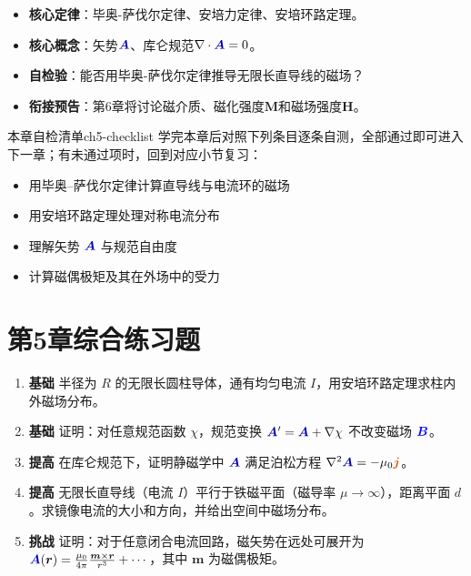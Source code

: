 \documentclass[11pt,a4paper,openany,oneside]{book}
\newcommand{\vecB}{\textcolor{blue}{\vect{B}}}
\newcommand{\vecJ}{\textcolor{cororange}{\vect{j}}}
\newcommand{\vecA}{\textcolor{blue!70!black}{\vect{A}}}
\newcommand{\muz}{\mu_0}
\newcommand{\vect}[1]{\bm{#1}}
\newcommand{\divg}{\nabla\cdot}
\newcommand{\lap}{\nabla^2}
\begin{document}
\begin{chapterreview}
\begin{itemize}[nosep]
\item \textbf{核心定律}：毕奥-萨伐尔定律、安培力定律、安培环路定理。
\item \textbf{核心概念}：矢势$\vecA$、库仑规范$\divg\vecA=0$。
\item \textbf{自检验}：能否用毕奥-萨伐尔定律推导无限长直导线的磁场？
\item \textbf{衔接预告}：第6章将讨论磁介质、磁化强度$\vect{M}$和磁场强度$\vect{H}$。
\end{itemize}
\end{chapterreview}

\begin{tip}{本章自检清单}{ch5-checklist}
学完本章后对照下列条目逐条自测，全部通过即可进入下一章；有未通过项时，回到对应小节复习：
\begin{itemize}[label=$\square$, nosep]
\item 用毕奥--萨伐尔定律计算直导线与电流环的磁场
\item 用安培环路定理处理对称电流分布
\item 理解矢势 $\vecA$ 与规范自由度
\item 计算磁偶极矩及其在外场中的受力
\end{itemize}
\end{tip}

\section*{第5章综合练习题}
\begin{enumerate}[label=\textbf{\arabic*.}]
\item \textbf{基础} 半径为 $R$ 的无限长圆柱导体，通有均匀电流 $I$，用安培环路定理求柱内外磁场分布。
\item \textbf{基础} 证明：对任意规范函数 $\chi$，规范变换 $\vecA'=\vecA+\nabla\chi$ 不改变磁场 $\vecB$。
\item \textbf{提高} 在库仑规范下，证明静磁学中 $\vecA$ 满足泊松方程 $\lap\vecA=-\muz\vecJ$。
\item \textbf{提高} 无限长直导线（电流 $I$）平行于铁磁平面（磁导率 $\mu\to\infty$），距离平面 $d$。求镜像电流的大小和方向，并给出空间中磁场分布。
\item \textbf{挑战} 证明：对于任意闭合电流回路，磁矢势在远处可展开为 $\vecA(\vect{r})=\frac{\muz}{4\pi}\frac{\vect{m}\times\vect{r}}{r^3}+\cdots$，其中 $\vect{m}$ 为磁偶极矩。
\end{enumerate}
\newpage
\end{document}
